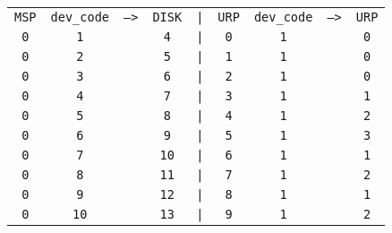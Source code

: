 \begin{center}
    \begin{tabular}{ccccccccc}
        \texttt{MSP} & \texttt{dev\_code} & \texttt{-->} & \texttt{DISK} & \texttt{|} & \texttt{URP} & \texttt{dev\_code} & \texttt{-->} & \texttt{URP} \\
		\texttt{0} & \texttt{1} & & \texttt{4} & \texttt{|} & \texttt{0} & \texttt{1} & & \texttt{0} \\
		\texttt{0} & \texttt{2} & & \texttt{5} & \texttt{|} & \texttt{1} & \texttt{1} & & \texttt{0} \\
		\texttt{0} & \texttt{3} & & \texttt{6} & \texttt{|} & \texttt{2} & \texttt{1} & & \texttt{0} \\
		\texttt{0} & \texttt{4} & & \texttt{7} & \texttt{|} & \texttt{3} & \texttt{1} & & \texttt{1} \\
		\texttt{0} & \texttt{5} & & \texttt{8} & \texttt{|} & \texttt{4} & \texttt{1} & & \texttt{2} \\
		\texttt{0} & \texttt{6} & & \texttt{9} & \texttt{|} & \texttt{5} & \texttt{1} & & \texttt{3} \\
		\texttt{0} & \texttt{7} & & \texttt{10} & \texttt{|} & \texttt{6} & \texttt{1} & & \texttt{1} \\
		\texttt{0} & \texttt{8} & & \texttt{11} & \texttt{|} & \texttt{7} & \texttt{1} & & \texttt{2} \\
		\texttt{0} & \texttt{9} & & \texttt{12} & \texttt{|} & \texttt{8} & \texttt{1} & & \texttt{1} \\
		\texttt{0} & \texttt{10} & & \texttt{13} & \texttt{|} & \texttt{9} & \texttt{1} & & \texttt{2} \\
    \end{tabular}
\end{center}

